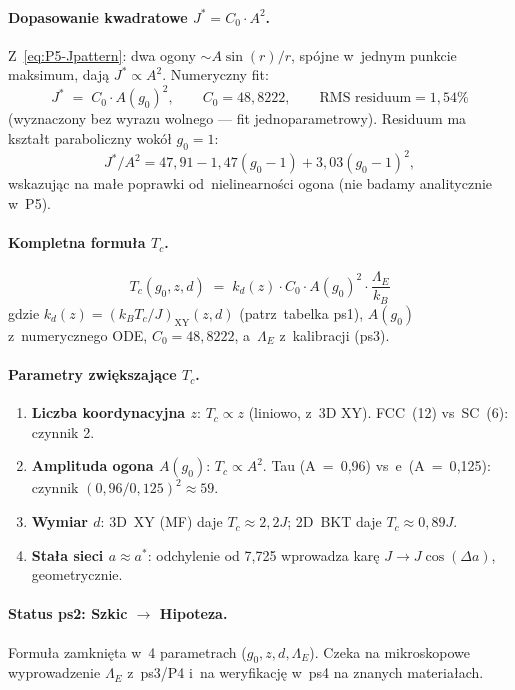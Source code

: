 \paragraph{Dopasowanie kwadratowe $J^* = C_0\cdot A^2$.}
Z~\eqref{eq:P5-Jpattern}: dwa ogony $\sim A\sin(r)/r$, sp\'ojne w~jednym
punkcie maksimum, daj\k{a} $J^* \propto A^2$. Numeryczny fit:
\begin{equation}
\label{eq:P5-C0}
  \boxed{\;\; J^* \;=\; C_0 \cdot A(g_0)^2, \qquad C_0 = 48{,}8222,
  \qquad \text{RMS~residuum} = 1{,}54\% \;\;}
\end{equation}
(wyznaczony bez wyrazu wolnego --- fit jednoparametrowy).
Residuum ma kszta\l{}t paraboliczny wokó\l{} $g_0 = 1$:
\[
  J^*/A^2 = 47{,}91 - 1{,}47(g_0-1) + 3{,}03(g_0-1)^2,
\]
wskazuj\k{a}c na ma\l{}e poprawki od~nielinearno\'sci ogona
(nie badamy analitycznie w~P5).

\paragraph{Kompletna formu\l{}a $T_c$.}
\begin{equation}
\label{eq:P5-Tc}
  \boxed{\;\;
   T_c(g_0, z, d)
   \;=\;
   k_d(z) \cdot C_0 \cdot A(g_0)^2 \cdot \frac{\Lambda_E}{k_B}
   \;\;}
\end{equation}
gdzie $k_d(z) = (k_BT_c/J)_\text{XY}(z,d)$ (patrz~tabelka ps1),
$A(g_0)$ z~numerycznego ODE, $C_0 = 48{,}8222$,
a~$\Lambda_E$ z~kalibracji (ps3).

\paragraph{Parametry zwi\k{e}kszaj\k{a}ce $T_c$.}
\begin{enumerate}[nosep]
  \item \textbf{Liczba koordynacyjna $z$}: $T_c \propto z$
    (liniowo, z~3D XY). FCC~(12) vs~SC~(6): czynnik 2.
  \item \textbf{Amplituda ogona $A(g_0)$}: $T_c \propto A^2$.
    Tau (A~=~0{,}96) vs~e~(A~=~0{,}125): czynnik $(0{,}96/0{,}125)^2 \approx 59$.
  \item \textbf{Wymiar $d$}: 3D~XY (MF) daje $T_c \approx 2{,}2J$;
    2D~BKT daje $T_c \approx 0{,}89 J$.
  \item \textbf{Sta\l{}a sieci $a \approx a^*$}: odchylenie od 7{,}725
    wprowadza kar\k{e} $J \to J\cos(\Delta a)$, geometrycznie.
\end{enumerate}

\paragraph{Status ps2: Szkic $\to$ Hipoteza.}
Formu\l{}a zamkni\k{e}ta w~4 parametrach ($g_0, z, d, \Lambda_E$).
Czeka na mikroskopowe wyprowadzenie $\Lambda_E$ z~ps3/P4 i~na weryfikacj\k{e}
w~ps4 na znanych materia\l{}ach.

